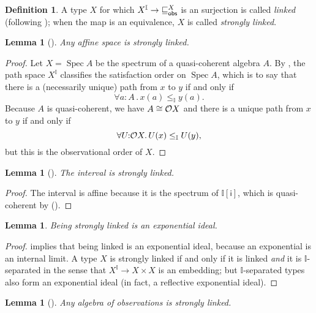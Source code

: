 \documentclass[a4paper,12pt]{amsart}
\newtheorem{lemma}[theorem]{Lemma}
\theoremstyle{definition}
\newtheorem{definition}[theorem]{Definition}
\newcommand{\mbb}[1]{\mathbb{#1}}
\newcommand{\I}{\mbb I}
\newcommand{\ms}[1]{\mathsf{#1}}
\newcommand{\fa}[2]{\forall #1\!\colon\!\!#2\mathpunct{.}}
\newcommand{\spec}{\operatorname{Spec}}
\begin{document}
\begin{definition}
  A type $X$ for which $X^\I\to {\obsle[X]}$ is an surjection is called \emph{linked} (following \citet{PhoaWesleyKym-Son1991DtiR}); when the map is an equivalence, $X$ is called \emph{strongly linked}.
\end{definition}

\begin{lemma}[\AxiomSQCP]\label{lem:affine-strongly-linked}
  Any affine space is strongly linked.
\end{lemma}

\begin{proof}
  Let $X=\spec{A}$ be the spectrum of a quasi-coherent algebra $A$. 
  By , the path space $X^\I$ classifies the satisfaction order on $\spec{A}$, which is to say that there is a (necessarily unique) path from $x$ to $y$ if and only if \[\fa{a}{A} x(a)\le_\I y(a)\text{.}\] Because $A$ is quasi-coherent, we have $A\cong \mathcal{O} X$ and there is a unique path from $x$ to $y$ if and only if \[\fa{U}{\opens{X}} U(x)\le_\I U(y)\text{,}\] but this is the observational order of $X$.
\end{proof}

\begin{lemma}[\AxiomSQCP]\label{lem:int-strong-link}
  The interval is strongly linked.
\end{lemma}

\begin{proof}
  The interval is affine because it is the spectrum of $\I[\ms{i}]$, which is quasi-coherent by (\AxiomSQCP).
\end{proof}

\begin{lemma}\label{lem:strong-link-exp-ideal}
  Being strongly linked is an exponential ideal.
\end{lemma}

\begin{proof}
  \citet[Prop.\ 5.4.4]{PhoaWesleyKym-Son1991DtiR} implies that being linked is an exponential ideal, because an exponential is an internal limit. A type $X$ is strongly linked if and only if it is linked \emph{and} it is $\I$-separated in the sense that $X^\I\to X\times X$ is an embedding; but $\I$-separated types also form an exponential ideal (in fact, a reflective exponential ideal).
\end{proof}

\begin{lemma}[\AxiomSQCP]\label{lem:O-strongly-linked}
  Any algebra of observations is strongly linked.
\end{lemma}
\end{document}
